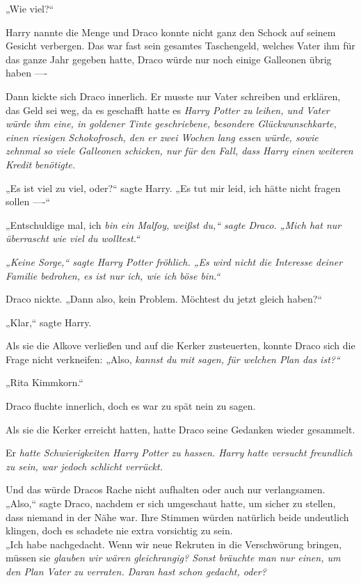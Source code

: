 {„Wie viel?“

Harry nannte die Menge und Draco konnte nicht ganz den Schock auf seinem Gesicht verbergen. Das war fast sein gesamtes Taschengeld, welches Vater ihm für das ganze Jahr gegeben hatte, Draco würde nur noch einige Galleonen übrig haben ----

Dann kickte sich Draco innerlich. Er musste nur Vater schreiben und erklären, das Geld sei weg, da es geschafft hatte es \emph{Harry Potter zu leihen, und Vater würde ihm eine, in goldener Tinte geschriebene, besondere Glückwunschkarte, einen riesigen Schokofrosch, den er zwei Wochen lang essen würde, sowie zehnmal so viele Galleonen schicken, nur für den Fall, dass Harry einen weiteren Kredit benötigte.}

„Es ist viel zu viel, oder?“ sagte Harry. „Es tut mir leid, ich hätte nicht fragen sollen ----“

„Entschuldige mal, ich \emph{bin ein Malfoy, weißst du,“ sagte Draco. „Mich hat nur überrascht wie viel du \emph{wolltest.“}}

\emph{„Keine Sorge,“ sagte Harry Potter fröhlich. „Es wird nicht die Interesse deiner Familie bedrohen, es ist nur ich, wie ich böse bin.“}

Draco nickte. „Dann also, kein Problem. Möchtest du jetzt gleich haben?“

„Klar,“ sagte Harry.

Als sie die Alkove verließen und auf die Kerker zusteuerten, konnte Draco sich die Frage nicht verkneifen: „Also, \emph{kannst du mit sagen, für welchen Plan das ist?“}

„Rita Kimmkorn.“

Draco fluchte innerlich, doch es war zu spät nein zu sagen.

Als sie die Kerker erreicht hatten, hatte Draco seine Gedanken wieder gesammelt.

Er \emph{hatte Schwierigkeiten Harry Potter zu hassen. Harry \emph{hatte} versucht freundlich zu sein, war jedoch schlicht verrückt.}

Und das würde Dracos Rache nicht aufhalten oder auch nur verlangsamen. „Also,“ sagte Draco, nachdem er sich umgeschaut hatte, um sicher zu stellen, dass niemand in der Nähe war. Ihre Stimmen würden natürlich beide undeutlich klingen, doch es schadete nie extra vorsichtig zu sein.\\ „Ich habe nachgedacht. Wenn wir neue Rekruten in die Verschwörung bringen, müssen sie \emph{glauben wir wären gleichrangig? Sonst bräuchte man nur \emph{einen,} um den Plan Vater zu verraten. Daran hast schon gedacht, oder?}

}
